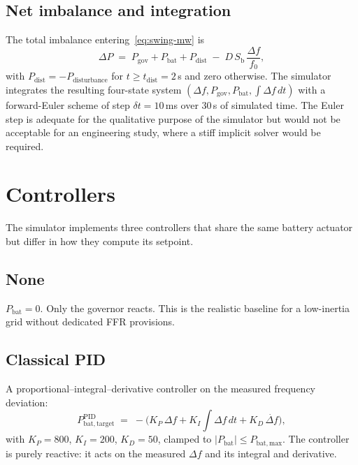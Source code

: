 \documentclass[conference]{IEEEtran}
\begin{document}
\subsection{Net imbalance and integration}
The total imbalance entering~\eqref{eq:swing-mw} is
\begin{equation}
\Delta P \;=\; P_{\mathrm{gov}} + P_{\mathrm{bat}} + P_{\mathrm{dist}} \;-\; D\,S_{\mathrm{b}}\,\frac{\Delta f}{f_0},
\end{equation}
with $P_{\mathrm{dist}} = -P_{\mathrm{disturbance}}$ for $t \geq t_{\mathrm{dist}} = 2$\,s and zero otherwise. The simulator integrates the resulting four-state system $(\Delta f, P_{\mathrm{gov}}, P_{\mathrm{bat}}, \int\!\Delta f\,dt)$ with a forward-Euler scheme of step $\delta t = 10$\,ms over 30\,s of simulated time. The Euler step is adequate for the qualitative purpose of the simulator but would not be acceptable for an engineering study, where a stiff implicit solver would be required.

\section{Controllers}\label{sec:ctrl}
The simulator implements three controllers that share the same battery actuator but differ in how they compute its setpoint.

\subsection{None}
$P_{\mathrm{bat}} = 0$. Only the governor reacts. This is the realistic baseline for a low-inertia grid without dedicated FFR provisions.

\subsection{Classical PID}
A proportional--integral--derivative controller on the measured frequency deviation:
\begin{equation}
P_{\mathrm{bat,target}}^{\mathrm{PID}} \;=\; -\bigl(K_P\,\Delta f + K_I\!\!\int\!\Delta f\,dt + K_D\,\dot{\Delta f}\bigr),
\label{eq:pid}
\end{equation}
with $K_P = 800$, $K_I = 200$, $K_D = 50$, clamped to $|P_{\mathrm{bat}}| \leq P_{\mathrm{bat,max}}$. The controller is purely reactive: it acts on the measured $\Delta f$ and its integral and derivative.
\end{document}
